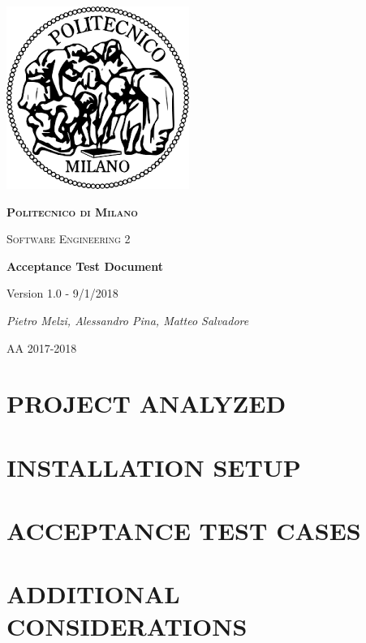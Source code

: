 \documentclass[11pt]{report}
\begin{document}
	\begin{titlepage}
		\centering
		\includegraphics{logo.png}\par\vspace{1cm}
		{\scshape\LARGE\bfseries Politecnico di Milano \par}
		\vspace{1cm}
		{\scshape\Large Software Engineering 2\par}
		\vspace{1.5cm}
		{\Huge\bfseries Acceptance Test Document\par}
		\vspace{1cm}
		{\small Version 1.0 - 9/1/2018\par}
		\vspace{1cm}
		{\Large\itshape Pietro Melzi, Alessandro Pina, Matteo Salvadore\par}

		\vfill

		{\large AA 2017-2018\par}
	\end{titlepage}

	\tableofcontents{}

	\chapter{PROJECT ANALYZED}
	\label{ch:PROJECT ANALYZED}
		
			
	\chapter{INSTALLATION SETUP}
	\label{ch:INSTALLATION SETUP}
		
			
	\chapter{ACCEPTANCE TEST CASES}
	\label{ch:ACCEPTANCE TEST CASES}
		
	
	\chapter{ADDITIONAL CONSIDERATIONS}
	\label{ch:ADDITIONAL CONSIDERATIONS}	
		
\end{document}

